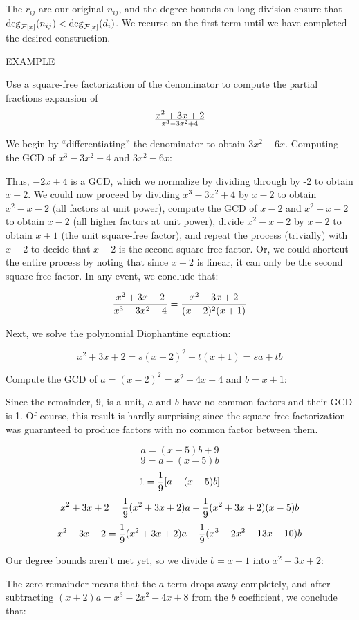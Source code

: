 The $r_{ij}$ are our original $n_{ij}$, and the degree bounds on long
division ensure that $\deg_{{\cal F}[x]}(n_{ij}) < \deg_{{\cal F}[x]}(d_i)$.
We recurse on the first term until we have completed the desired construction.

\vfill\eject

EXAMPLE

Use a square-free factorization of the denominator to compute the partial fractions expansion of $${x^2 + 3x + 2}\over{x^3-3x^2+4}$$

We begin by ``differentiating'' the denominator to obtain $3x^2-6x$.
Computing the GCD of $x^3-3x^2+4$ and $3x^2-6x$:



Thus, $-2x+4$ is a GCD, which we normalize by dividing through by -2
to obtain $x-2$.  We could now proceed by dividing $x^3-3x^2+4$ by
$x-2$ to obtain $x^2-x-2$ (all factors at unit power), compute the GCD
of $x-2$ and $x^2-x-2$ to obtain $x-2$ (all higher factors at unit
power), divide $x^2-x-2$ by $x-2$ to obtain $x+1$ (the unit
square-free factor), and repeat the process (trivially) with $x-2$ to
decide that $x-2$ is the second square-free factor.  Or, we could
shortcut the entire process by noting that since $x-2$ is linear,
it can only be the second square-free factor.  In any event, we conclude that:


$${{x^2 + 3x + 2}\over{x^3-3x^2+4}} = {{x^2 + 3x + 2}\over{(x-2)^2(x+1)}}$$

Next, we solve the polynomial Diophantine equation:

$$x^2 + 3x + 2 = s(x-2)^2 + t(x+1) = sa+tb$$

Compute the GCD of $a=(x-2)^2=x^2-4x+4$ and $b=x+1$:



Since the remainder, 9, is a unit, $a$ and $b$ have no common
factors and their GCD is 1.  Of course, this result is hardly
surprising since the square-free factorization was guaranteed
to produce factors with no common factor between them.

$$a=(x-5)b+9$$
$$9=a-(x-5)b$$
$$1={1\over9}[a-(x-5)b]$$
$$x^2 + 3x + 2 = {1\over9}(x^2+3x+2)a-{1\over9}(x^2+3x+2)(x-5)b$$
$$x^2 + 3x + 2 = {1\over9}(x^2+3x+2)a-{1\over9}(x^3-2x^2-13x-10)b$$

Our degree bounds aren't met yet, so we divide $b=x+1$ into $x^2+3x+2$:



The zero remainder means that the $a$ term drops away completely,
and after subtracting $(x+2)a=x^3-2x^2-4x+8$ from the $b$ coefficient,
we conclude that:

